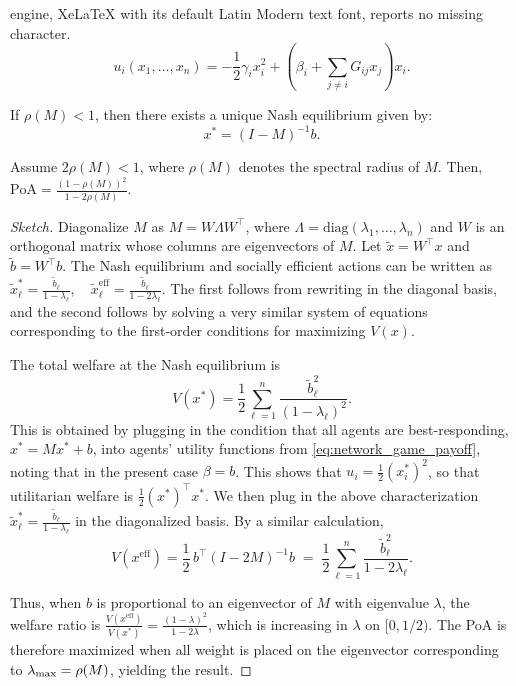 \documentclass[10pt,a4paper]{amsart}
\renewcommand{\max}{\operatornamewithlimits{max}}
\begin{document}
engine, XeLaTeX with its default Latin Modern text font, reports no missing character.
\begin{equation}
u_i(x_1, \ldots, x_n) = -\frac{1}{2} \gamma_i x_i^2 +  \left( \beta_i + \sum_{j \neq i} G_{ij} x_j \right)x_i.
\label{eq:network_game_payoff}
\end{equation}

\begin{fact} \label{fact:Nash}
If $\rho(M) < 1$, then there exists a unique Nash equilibrium given by:
\begin{equation} \label{eq:Nash}
x^* = (I - M)^{-1} b.
\end{equation}
\end{fact}

\begin{prop}
\label{thm:poa}
Assume $2\rho(M)<1$, where $\rho(M)$ denotes the spectral radius of $M$. Then,
$
\text{PoA} = \frac{(1-\rho(M))^2}{1-2\rho(M)}.
$
\end{prop}

\begin{proof}[Sketch]

Diagonalize $M$ as $M = W \Lambda W^\top$, where $\Lambda = \text{diag}(\lambda_1, \ldots, \lambda_n)$ and $W$ is an orthogonal matrix whose columns are eigenvectors of $M$. Let $\tilde{x} = W^\top x$ and $\tilde{b} = W^\top b$. The Nash equilibrium and socially efficient actions can be written as
$
\tilde{x}_\ell^* = \frac{\tilde{b}_\ell}{1 -  \lambda_\ell}, \quad \tilde{x}_\ell^{\mathrm{eff}} = \frac{\tilde{b}_\ell}{1 - 2 \lambda_\ell}.
$ The first follows from rewriting  in the diagonal basis, and the second follows by solving a very similar system of equations corresponding to the first-order conditions for maximizing $V(x)$.

The total welfare at the Nash equilibrium is
\begin{equation}
V(x^*) = \frac{1}{2} \sum_{\ell=1}^n \frac{\tilde{b}_\ell^2}{(1 -  \lambda_\ell)^2}.  \end{equation} This is obtained by plugging in the condition that all agents are best-responding, $x^*=Mx^* + b$, into agents' utility functions from \cref{eq:network_game_payoff}, noting that in the present case $\beta=b$. This shows that $u_i = \frac{1}{2}(x_i^*)^2$, so that utilitarian welfare is $\frac{1}{2} (x^*)^\top x^*$. We then plug in the above characterization $\tilde{x}_\ell^* = \frac{\tilde{b}_\ell}{1 -  \lambda_\ell}$ in the diagonalized basis. By a similar calculation,
\begin{equation}
V(x^{\mathrm{eff}}) = \frac{1}{2}\, b^\top (I-2M)^{-1} b
 \;=\; \frac{1}{2} \sum_{\ell=1}^n \frac{\tilde{b}_\ell^2}{1 - 2 \lambda_\ell}.
\end{equation}

Thus, when $b$ is proportional to an eigenvector of $M$ with eigenvalue $\lambda$, the welfare ratio is
$\frac{V(x^{\mathrm{eff}})}{V(x^*)}=\frac{(1-\lambda)^2}{1-2\lambda}$, which is increasing in $\lambda$ on $[0,1/2)$. The PoA is therefore maximized when all weight is placed on the eigenvector corresponding to $\lambda_{\max} = \rho(M)$, yielding the result.
\end{proof}
\end{document}
